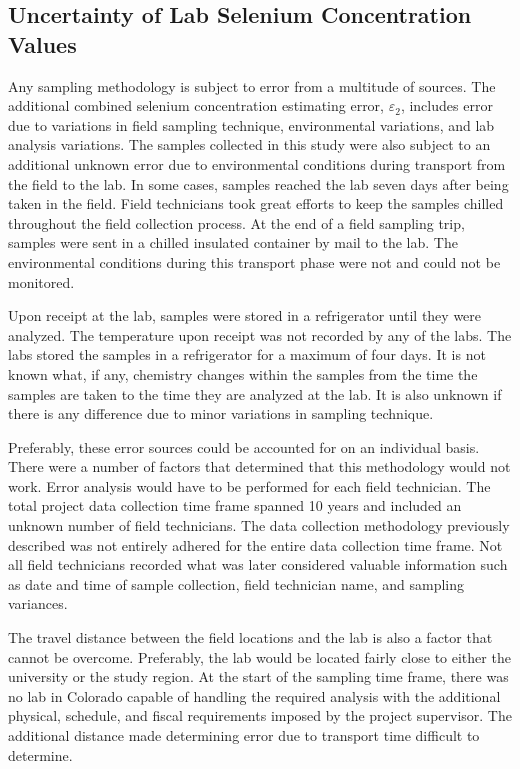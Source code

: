 \subsection{Uncertainty of Lab Selenium Concentration Values}
Any sampling methodology is subject to error from a multitude of sources.  The additional combined selenium concentration estimating error, $\varepsilon_{2}$, includes error due to variations in field sampling technique, environmental variations, and lab analysis variations.  The samples collected in this study were also subject to an additional unknown error due to environmental conditions during transport from the field to the lab.  In some cases, samples reached the lab seven days after being taken in the field.  Field technicians took great efforts to keep the samples chilled throughout the field collection process.  At the end of a field sampling trip, samples were sent in a chilled insulated container by mail to the lab.  The environmental conditions during this transport phase were not and could not be monitored.

Upon receipt at the lab, samples were stored in a refrigerator until they were analyzed.  The temperature upon receipt was not recorded by any of the labs.  The labs stored the samples in a refrigerator for a maximum of four days.  It is not known what, if any, chemistry changes within the samples from the time the samples are taken to the time they are analyzed at the lab.  It is also unknown if there is any difference due to minor variations in sampling technique.

Preferably, these error sources could be accounted for on an individual basis.  There were a number of factors that determined that this methodology would not work.  Error analysis would have to be performed for each field technician.  The total project data collection time frame spanned 10 years and included an unknown number of field technicians.  The data collection methodology previously described was not entirely adhered for the entire data collection time frame.  Not all field technicians recorded what was later considered valuable information such as date and time of sample collection, field technician name, and sampling variances.

The travel distance between the field locations and the lab is also a factor that cannot be overcome.  Preferably, the lab would be located fairly close to either the university or the study region.  At the start of the sampling time frame, there was no lab in Colorado capable of handling the required analysis with the additional physical, schedule, and fiscal requirements imposed by the project supervisor.  The additional distance made determining error due to transport time difficult to determine.

